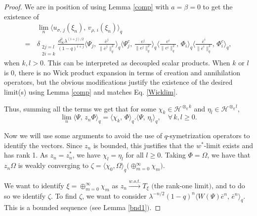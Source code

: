 \documentclass[12pt, a4paper,reqno]{amsart}
\theoremstyle{definition}
\renewcommand{\geq}{\geqslant}
\newcommand{\CH}{\mathcal{H}}
\begin{document}
\begin{proof}
We are in position of using Lemma \ref{comp} with $a=\beta=0$ to get the existence of 
\begin{align}\label{Wicklim}
&\lim_n \langle u_{\sigma,\,j}(\xi_n),\,v_{\rho,\,i}(\xi_n)\rangle_q\\
%
\nonumber=\,& \delta_{\substack{2j=l\\2i=k}} \frac{d_\infty^2 \lambda^{(i+j)/2}}{(1-q)^{i+j}}
\langle\Psi_j,\,\frac {\bar{e}^{j}}{\|\bar{e}^{j}\|_q^2}\rangle_q \langle\Psi_j^c,\, \frac {e^{j}}{\|{e}^{j}\|_q^2} \rangle_q\langle\frac {{e}^{i}}{\|e^{i}\|_q^2},\,\Phi_i\rangle_q\langle{\frac {{\bar{e}}^{i}}{\|{\bar{e}}^{i}\|_q^2}},\,\Phi_i^c\rangle_q, 
\end{align}
{when $k,l>0$}. This can be interpreted as decoupled scalar products. {When $k$ or $l$ is $0$, there is no Wick product expansion in terms of creation and annihilation operators, but the obvious modifications justify the existence of the desired limit(s)  using Lemma \ref{comp} and matches Eq. \eqref{Wicklim}}. 

Thus, summing all the terms we get that for some $\chi_k\in \CH^{\otimes_q k}$ and 
$\eta_l\in \CH^{\otimes_q l}$,
$$\lim_n \langle \Psi,\, z_n \Phi \rangle_q = \langle \chi_k,\,\Phi\rangle_q.\langle  \Psi,\,\eta_l\rangle_q,\quad \forall\, k,l\geq 0.$$

Now we will use some arguments to avoid the use of $q$-symetrization operators to identify the vectors. Since $z_n$ is bounded, this justifies that the $w^*$-limit exists and has rank 1. As $z_n=z_n^*$, we have $\chi_l=\eta_l$ for all $l\geq 0$. Taking $\Phi=\Omega$, we have that $z_n\Omega$ is weakly converging to {$\zeta=\langle \chi_0,\Omega\rangle_q\big(\oplus_{m=0}^\infty\chi_m\big)$}. 

We want to identify $\xi = \oplus_{m=0}^\infty \chi_m$ as $z_n\overset{w.o.t.}\rightarrow T_{\xi}$ $($the rank-one limit$)$, and to do so we identify $\zeta$. To find $\zeta$, we want to consider $\lambda^{-n/2}(1-q)^n\langle W(\Psi) \bar{e}^n, \,\bar{e}^n\rangle_q$. This is a bounded sequence $($see Lemma \ref{bnd1}$)$.  


\end{proof}
\end{document}
